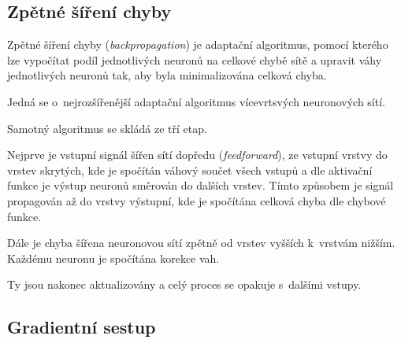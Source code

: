 \subsection{Zpětné šíření chyby}

\begin{compactitem}
    \item Zpětné šíření chyby (\textit{backpropagation}) je adaptační algoritmus, pomocí kterého lze vypočítat podíl jednotlivých neuronů na celkové chybě sítě a upravit váhy jednotlivých neuronů tak, aby byla minimalizována celková chyba.

    \item Jedná se o~nejrozšířenější adaptační algoritmus vícevrtsvých neuronových sítí.

    \item Samotný algoritmus se skládá ze tří etap. \begin{compactitem}
        \item Nejprve je vstupní signál šířen sítí dopředu (\textit{feedforward}), ze vstupní vrstvy do vrstev skrytých, kde je spočítán váhový součet všech vstupů a dle aktivační funkce je výstup neuronů směrován do dalších vrstev. Tímto způsobem je signál propagován až do vrstvy výstupní, kde je spočítána celková chyba dle chybové funkce.

        \item Dále je chyba šířena neuronovou sítí zpětně od vrstev vyšších k~vrstvám nižším. Každému neuronu je spočítána korekce vah.

        \item Ty jsou nakonec aktualizovány a celý proces se opakuje s~dalšími vstupy.
    \end{compactitem}
\end{compactitem}

\subsection{Gradientní sestup}

